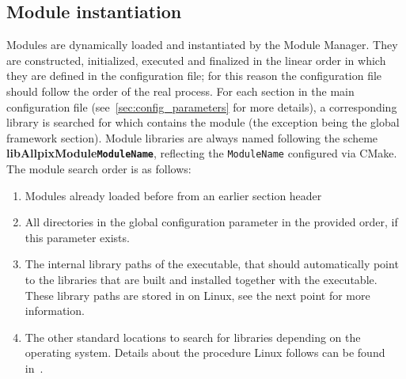 \subsection{Module instantiation}
\label{sec:module_instantiation}
Modules are dynamically loaded and instantiated by the Module Manager.
They are constructed, initialized, executed and finalized in the linear order in which they are defined in the configuration file; for this reason the configuration file should follow the order of the real process.
For each section in the main configuration file (see~\ref{sec:config_parameters} for more details), a corresponding library is searched for which contains the module (the exception being the global framework section).
Module libraries are always named following the scheme \textbf{libAllpixModule\texttt{ModuleName}}, reflecting the \texttt{ModuleName} configured via CMake.
The module search order is as follows:
\begin{enumerate}
\item Modules already loaded before from an earlier section header
\item All directories in the global configuration parameter  in the provided order, if this parameter exists.
\item The internal library paths of the executable, that should automatically point to the libraries that are built and installed together with the executable.
These library paths are stored in  on Linux, see the next point for more information.
\item The other standard locations to search for libraries depending on the operating system.
Details about the procedure Linux follows can be found in~\cite{linuxld}.
\end{enumerate}

